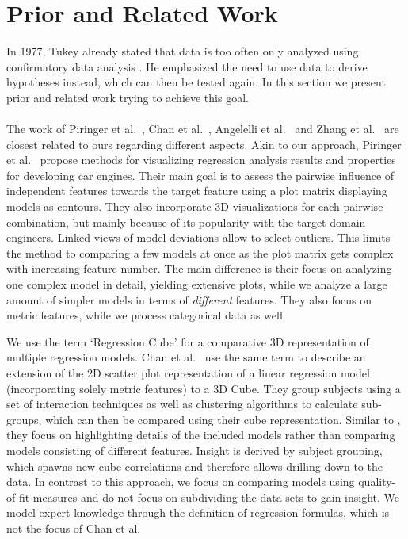 \documentclass[journal]{style/vgtc} 			          %
\begin{document}
\section{Prior and Related Work}
In 1977, Tukey already stated that data is too often only analyzed using confirmatory data analysis \cite{Tukey}.
He emphasized the need to use data to derive hypotheses instead, which can then be tested again.
In this section we present prior and related work trying to achieve this goal.
\\\\
The work of Piringer et al.~\cite{Piringer}, Chan et al.~\cite{Chan}, Angelelli et al.~\cite{Angelelli} and Zhang et al.~\cite{Zhang2014} are closest related to ours regarding different aspects.
Akin to our approach, Piringer et al.~\cite{Piringer} propose methods for visualizing regression analysis results and properties for developing car engines.
Their main goal is to assess the pairwise influence of independent features towards the target feature using a plot matrix displaying models as contours.
They also incorporate 3D visualizations for each pairwise combination, but mainly because of its popularity with the target domain engineers.
Linked views of model deviations allow to select outliers.
This limits the method to comparing a few models at once as the plot matrix gets complex with increasing feature number.
The main difference is their focus on analyzing one complex model in detail, yielding extensive plots, while we analyze a large amount of simpler models in terms of \emph{different} features.
They also focus on metric features, while we process categorical data as well.

We use the term `Regression Cube' for a comparative 3D representation of multiple regression models.
Chan et al.~\cite{Chan} use the same term to describe an extension of the 2D scatter plot representation of a linear regression model (incorporating solely metric features) to a 3D Cube.
They group subjects using a set of interaction techniques as well as clustering algorithms to calculate sub-groups, which can then be compared using their cube representation.
Similar to \cite{Piringer}, they focus on highlighting details of the included models rather than comparing models consisting of different features.
Insight is derived by subject grouping, which spawns new cube correlations and therefore allows drilling down to the data.
In contrast to this approach, we focus on comparing models using quality-of-fit measures and do not focus on subdividing the data sets to gain insight.
We model expert knowledge through the definition of regression formulas, which is not the focus of Chan et al.
\end{document}
